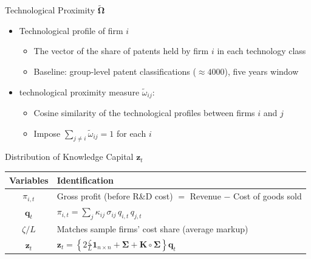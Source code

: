\documentclass[
  10pt,
  aspectratio=169,   %
]{beamer}
\theoremstyle{plain}
\begin{document}
\begin{frame}{Technological Proximity $\widetilde{\bm{\Omega}}$}
  \begin{itemize}
    \item Technological profile of firm $i$
          \begin{itemize}
            \item The vector of the share of patents held by firm $i$ in each technology class
            \item Baseline: group-level patent classifications ($\approx 4000$), five years window
                  \medskip{}
          \end{itemize}
          \medskip{}
    \item \citet{Jaffe1986-yz} technological proximity measure $\tilde{\omega}_{ij}$:
          \begin{itemize}
            \item Cosine similarity of the technological profiles between firms $i$ and $j$
            \item Impose $\sum_{j\neq i}\tilde{\omega}_{ij} = 1$ for each $i$
          \end{itemize}
  \end{itemize}
\end{frame}

\begin{frame}{Distribution of Knowledge Capital $\bm{z}_t$}
  \begin{table}[htbp]
    \centering
    \begin{tabular}{cl}
      \toprule
      Variables & Identification                                                                       \\
      \midrule
      $\pi_{i,t}$
                & Gross profit (before R\&D cost)
      $=$ Revenue $-$ Cost of goods sold                                                               \\[6pt]
      $\bm{q}_t$
                &
      $\pi_{i,t}=\displaystyle\sum_{j}\kappa_{ij}\,\sigma_{ij}\,q_{i,t}\,q_{j,t}$                      \\[6pt]
      $\zeta/L$
                & Matches sample firms' cost share (average markup)                                    \\[6pt]
      $\bm{z}_t$
                &
      $\displaystyle \bm{z}_{t}
      =\left\{2\frac{\zeta}{L}\bm{1}_{n\times n}+\bm{\Sigma}+\bm{K}\circ\bm{\Sigma}\right\}\bm{q}_{t}$ \\
      \bottomrule
    \end{tabular}
  \end{table}
\end{frame}
\end{document}

